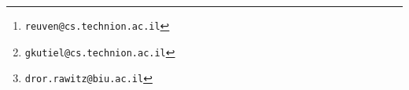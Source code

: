 \author[1]{Reuven Bar-Yehuda	\thanks{\texttt{reuven@cs.technion.ac.il}}}
\author[1]{Gilad Kutiel			\thanks{\texttt{gkutiel@cs.technion.ac.il}}}
\author[2]{Dror Rawitz			\thanks{\texttt{dror.rawitz@biu.ac.il}}}

